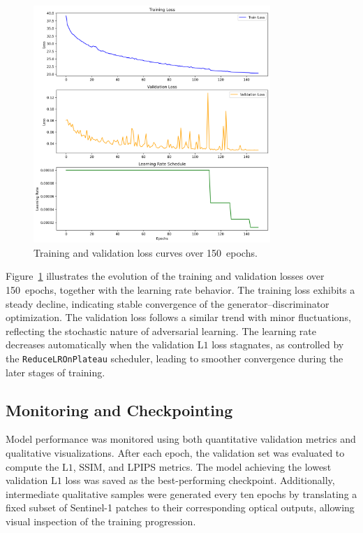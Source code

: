\begin{figure}[h!]
    \centering
    \includegraphics[width=0.8\textwidth,height=0.65\textheight]{img/training_curves.png}
    \caption{Training and validation loss curves over 150~epochs.}
    \label{fig:training_curve}
\end{figure}

Figure~\ref{fig:training_curve} illustrates the evolution of the training and validation losses over 150~epochs, together with the learning rate behavior. The training loss exhibits a steady decline, indicating stable convergence of the generator–discriminator optimization. The validation loss follows a similar trend with minor fluctuations, reflecting the stochastic nature of adversarial learning. The learning rate decreases automatically when the validation $\mathrm{L1}$ loss stagnates, as controlled by the \texttt{ReduceLROnPlateau} scheduler, leading to smoother convergence during the later stages of training.

\subsection{Monitoring and Checkpointing}
Model performance was monitored using both quantitative validation metrics and qualitative visualizations. After each epoch, the validation set was evaluated to compute the $\mathrm{L1}$, SSIM, and LPIPS metrics. The model achieving the lowest validation $\mathrm{L1}$ loss was saved as the best-performing checkpoint. Additionally, intermediate qualitative samples were generated every ten epochs by translating a fixed subset of Sentinel-1 patches to their corresponding optical outputs, allowing visual inspection of the training progression.

